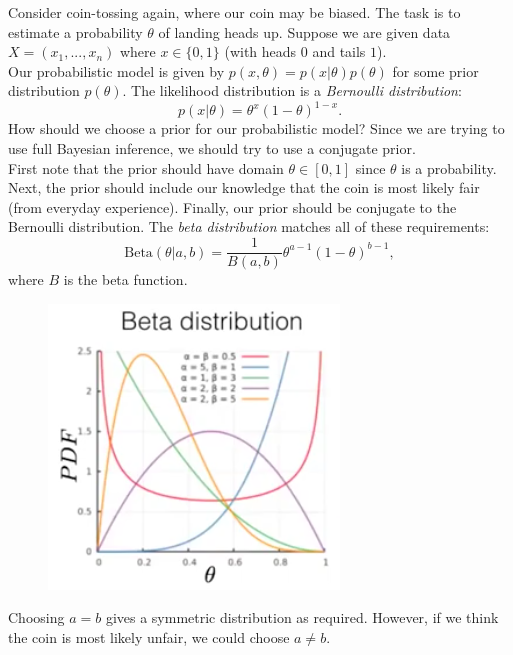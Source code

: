 \begin{frameex}
Consider coin-tossing again, where our coin may be biased. The task is to estimate a probability $\theta$ of landing heads up. Suppose we are given data $X = (x_1,...,x_n)$ where $x \in \{0,1\}$ (with heads $0$ and tails $1$).\\

Our probabilistic model is given by $p(x,\theta) = p(x | \theta) p(\theta)$ for some prior distribution $p(\theta)$. The likelihood distribution is a \textit{Bernoulli distribution}:
\begin{equation*}
p(x | \theta) = \theta^x (1 - \theta)^{1-x}. 
\end{equation*}
How should we choose a prior for our probabilistic model? Since we are trying to use full Bayesian inference, we should try to use a conjugate prior.\\

First note that the prior should have domain $\theta \in [0,1]$ since $\theta$ is a probability. Next, the prior should include our knowledge that the coin is most likely fair (from everyday experience). Finally, our prior should be conjugate to the Bernoulli distribution. The \textit{beta distribution} matches all of these requirements:
\begin{equation*}
\textrm{Beta}(\theta | a,b) = \frac{1}{B(a,b)} \theta^{a-1} (1-\theta)^{b-1},
\end{equation*}
where $B$ is the beta function.


\newpage
\begin{figure}[H]
\centering
\includegraphics[scale=0.4]{betadistribution.png}
\end{figure}

Choosing $a = b$ gives a symmetric distribution as required. However, if we think the coin is most likely unfair, we could choose $a \neq b$.\\


\end{frameex}
